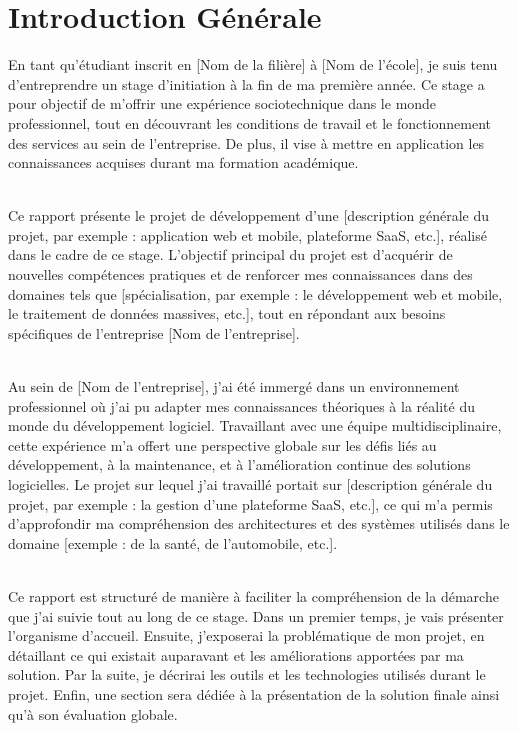 \chapter*{\Huge Introduction Générale
 }

En tant qu’étudiant inscrit en [Nom de la filière] à [Nom de l'école], je suis tenu d’entreprendre un stage d’initiation à la fin de ma première année. Ce stage a pour objectif de m'offrir une expérience sociotechnique dans le monde professionnel, tout en découvrant les conditions de travail et le fonctionnement des services au sein de l’entreprise. De plus, il vise à mettre en application les connaissances acquises durant ma formation académique.\\\

Ce rapport présente le projet de développement d’une [description générale du projet, par exemple : application web et mobile, plateforme SaaS, etc.], réalisé dans le cadre de ce stage. L’objectif principal du projet est d'acquérir de nouvelles compétences pratiques et de renforcer mes connaissances dans des domaines tels que [spécialisation, par exemple : le développement web et mobile, le traitement de données massives, etc.], tout en répondant aux besoins spécifiques de l’entreprise [Nom de l'entreprise].\\\

Au sein de [Nom de l'entreprise], j’ai été immergé dans un environnement professionnel où j’ai pu adapter mes connaissances théoriques à la réalité du monde du développement logiciel. Travaillant avec une équipe multidisciplinaire, cette expérience m'a offert une perspective globale sur les défis liés au développement, à la maintenance, et à l'amélioration continue des solutions logicielles. Le projet sur lequel j’ai travaillé portait sur [description générale du projet, par exemple : la gestion d'une plateforme SaaS, etc.], ce qui m'a permis d'approfondir ma compréhension des architectures et des systèmes utilisés dans le domaine [exemple : de la santé, de l’automobile, etc.].\\\

Ce rapport est structuré de manière à faciliter la compréhension de la démarche que j'ai suivie tout au long de ce stage. Dans un premier temps, je vais présenter l’organisme d’accueil. Ensuite, j'exposerai la problématique de mon projet, en détaillant ce qui existait auparavant et les améliorations apportées par ma solution. Par la suite, je décrirai les outils et les technologies utilisés durant le projet. Enfin, une section sera dédiée à la présentation de la solution finale ainsi qu'à son évaluation globale.\\\

\vspace{1cm}




